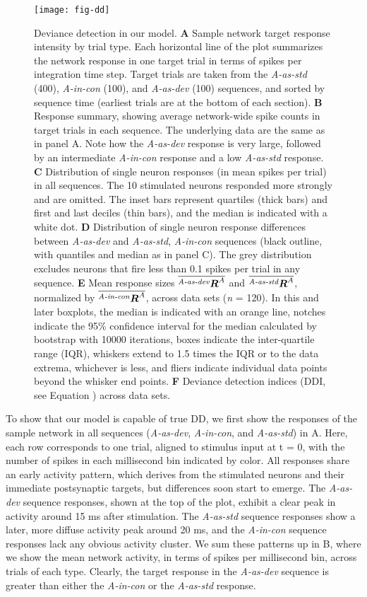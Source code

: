 \documentclass[9pt,lineno,onehalfspacing]{elife}
\newcommand{\dev}{\textit{A-as-dev}}
\newcommand{\msc}{\textit{A-in-con}}
\newcommand{\std}{\textit{A-as-std}}
\newcommand{\ifstringequal}[4]{%
  \ifnum\pdfstrcmp{#1}{#2}=0
  #3%
  \else
  #4%
  \fi
}
\newcommand{\seqreplace}[1]{\ifstringequal{dev}{#1}{\dev}{%
    \ifstringequal{std}{#1}{\std}{%
        \ifstringequal{msc}{#1}{\msc}{#1}%
    }%
}}
\newcommand{\R}[3][]{{}^{\seqreplace{#1}}_{}\boldsymbol R^{#2}_{#3}}
\newcommand{\mean}[1]{\overline{#1}}
\begin{document}
\begin{figure}
    \texttt{[image: fig-dd]}
    \caption{%
        Deviance detection in our model.
        \textbf{A} Sample network target response intensity by trial type. Each horizontal line of the plot summarizes the network response in one target trial in terms of spikes per integration time step. Target trials are taken from the \std{} (400), \msc{} (100), and \dev{} (100) sequences, and sorted by sequence time (earliest trials are at the bottom of each section).
        \textbf{B} Response summary, showing average network-wide spike counts in target trials in each sequence. The underlying data are the same as in panel A. Note how the \dev{} response is very large, followed by an intermediate \msc{} response and a low \std{} response.
        \textbf{C} Distribution of single neuron responses (in mean spikes per trial) in all sequences. The 10 stimulated neurons responded more strongly and are omitted. The inset bars represent quartiles (thick bars) and first and last deciles (thin bars), and the median is indicated with a white dot.
        \textbf{D} Distribution of single neuron response differences between \dev{} and \std{}, \msc{} sequences (black outline, with quantiles and median as in panel C). The grey distribution excludes neurons that fire less than 0.1 spikes per trial in any sequence.
        \textbf{E} Mean response sizes $\mean{\R[dev]{A}{}}$ and $\mean{\R[std]{A}{}}$, normalized by $\mean{\R[msc]{A}{}}$, across data sets (\textit{n} = 120). In this and later boxplots, the median is indicated with an orange line, notches indicate the 95\% confidence interval for the median calculated by bootstrap with 10000 iterations, boxes indicate the inter-quartile range (IQR), whiskers extend to 1.5 times the IQR or to the data extrema, whichever is less, and fliers indicate individual data points beyond the whisker end points.
        \textbf{F} Deviance detection indices (DDI, see Equation ) across data sets.
    }
    \label{fig:DD}
\end{figure}

To show that our model is capable of true DD, we first show the responses of the sample network in all sequences (\dev{}, \msc{}, and \std{}) in A. Here, each row corresponds to one trial, aligned to stimulus input at t = 0, with the number of spikes in each millisecond bin indicated by color. All responses share an early activity pattern, which derives from the stimulated neurons and their immediate postsynaptic targets, but differences soon start to emerge. The \dev{} sequence responses, shown at the top of the plot, exhibit a clear peak in activity around 15 ms after stimulation. The \std{} sequence responses show a later, more diffuse activity peak around 20 ms, and the \msc{} sequence responses lack any obvious activity cluster. We sum these patterns up in B, where we show the mean network activity, in terms of spikes per millisecond bin, across trials of each type. Clearly, the target response in the \dev{} sequence is greater than either the \msc{} or the \std{} response.
\end{document}
